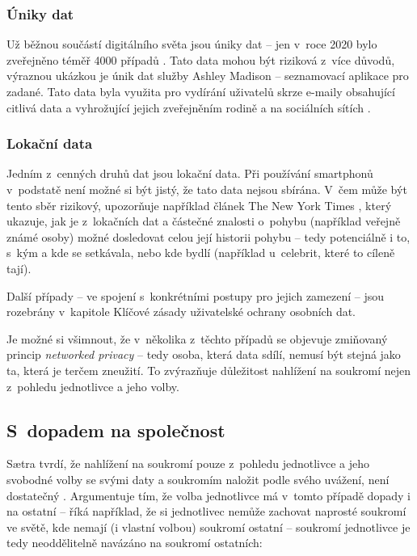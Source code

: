 \subsubsection*{Úniky dat}
Už běžnou součástí digitálního světa jsou úniky dat -- jen v~roce 2020 bylo zveřejněno téměř 4000 případů \citep{data-breaches-2021}. Tato data mohou být riziková z~více důvodů, výraznou ukázkou je únik dat služby Ashley Madison -- seznamovací aplikace pro zadané. Tato data byla využita pro vydírání uživatelů skrze e-maily obsahující citlivá data a vyhrožující jejich zveřejněním rodině a na sociálních sítích \citep{ashley-madison-leak}.

\subsubsection*{Lokační data}
Jedním z~cenných druhů dat jsou lokační data. Při používání smartphonů v~podstatě není možné si být jistý, že tato data nejsou sbírána. V~čem může být tento sběr rizikový, upozorňuje například článek The New York Times \citep{location-data}, který ukazuje, jak je z~lokačních dat a částečné znalosti o~pohybu (například veřejně známé osoby) možné dosledovat celou její historii pohybu -- tedy potenciálně i to, s~kým a kde se setkávala, nebo kde bydlí (například u~celebrit, které to cíleně tají).   

Další případy -- ve spojení s~konkrétními postupy pro jejich zamezení -- jsou rozebrány v~kapitole Klíčové zásady uživatelské ochrany osobních dat.

Je možné si všimnout, že v~několika z~těchto případů se objevuje zmiňovaný princip \textit{networked privacy} -- tedy osoba, která data sdílí, nemusí být stejná jako ta, která je terčem zneužití. To zvýrazňuje důležitost nahlížení na soukromí nejen z~pohledu jednotlivce a jeho volby.

\subsection{S~dopadem na společnost}
Sætra tvrdí, že nahlížení na soukromí pouze z~pohledu jednotlivce a jeho svobodné volby se svými daty a soukromím naložit podle svého uvážení, není dostatečný \citep{privacy-as-aggregate-public-good}. Argumentuje tím, že volba jednotlivce má v~tomto případě dopady i na ostatní -- říká například, že si jednotlivec nemůže zachovat naprosté soukromí ve světě, kde nemají (i vlastní volbou) soukromí ostatní  -- soukromí jednotlivce je tedy neoddělitelně navázáno na soukromí ostatních:

